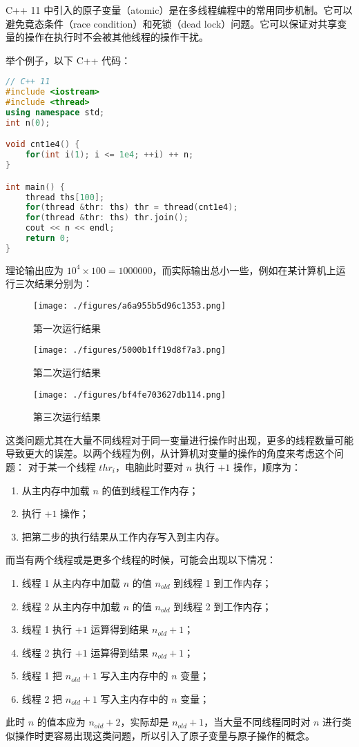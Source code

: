 
\begin{issues}
\issueDraft
\issueTODO
\end{issues}


C++ 11 中引入的原子变量（atomic）是在多线程编程中的常用同步机制。它可以避免竟态条件（race condition）和死锁（dead lock）问题。它可以保证对共享变量的操作在执行时不会被其他线程的操作干扰。

举个例子，以下 C++ 代码：
\begin{lstlisting}[language=cpp]
// C++ 11
#include <iostream>
#include <thread>
using namespace std;
int n(0);

void cnt1e4() {
	for(int i(1); i <= 1e4; ++i) ++ n;
}

int main() {
	thread ths[100];
	for(thread &thr: ths) thr = thread(cnt1e4);
	for(thread &thr: ths) thr.join();
	cout << n << endl;
	return 0;
}
\end{lstlisting}
理论输出应为 $10^4 \times 100 = 1000000$，而实际输出总小一些，例如在某计算机上运行三次结果分别为：
\begin{figure}[ht]
\centering
\texttt{[image: ./figures/a6a955b5d96c1353.png]}
\caption{第一次运行结果} \label{fig_atomVO_1}
\end{figure}
\begin{figure}[ht]
\centering
\texttt{[image: ./figures/5000b1ff19d8f7a3.png]}
\caption{第二次运行结果} \label{fig_atomVO_2}
\end{figure}
\begin{figure}[ht]
\centering
\texttt{[image: ./figures/bf4fe703627db114.png]}
\caption{第三次运行结果} \label{fig_atomVO_3}
\end{figure}
这类问题尤其在大量不同线程对于同一变量进行操作时出现，更多的线程数量可能导致更大的误差。以两个线程为例，从计算机对变量的操作的角度来考虑这个问题：
对于某一个线程 $thr_i$，电脑此时要对 $n$ 执行 $+1$ 操作，顺序为：
\begin{enumerate}
\item 从主内存中加载 $n$ 的值到线程工作内存；
\item 执行 $+1$ 操作；
\item 把第二步的执行结果从工作内存写入到主内存。
\end{enumerate}
而当有两个线程或是更多个线程的时候，可能会出现以下情况：
\begin{enumerate}
\item 线程 1 从主内存中加载 $n$ 的值 $n_{old}$ 到线程 1 到工作内存；
\item 线程 2 从主内存中加载 $n$ 的值 $n_{old}$ 到线程 2 到工作内存；
\item 线程 1 执行 $+1$ 运算得到结果 $n_{old}+1$；
\item 线程 2 执行 $+1$ 运算得到结果 $n_{old}+1$；
\item 线程 1 把 $n_{old}+1$ 写入主内存中的 $n$ 变量；
\item 线程 2 把 $n_{old}+1$ 写入主内存中的 $n$ 变量；
\end{enumerate}
此时 $n$ 的值本应为 $n_{old} + 2$，实际却是 $n_{old}+1$，当大量不同线程同时对 $n$ 进行类似操作时更容易出现这类问题，所以引入了原子变量与原子操作的概念。

